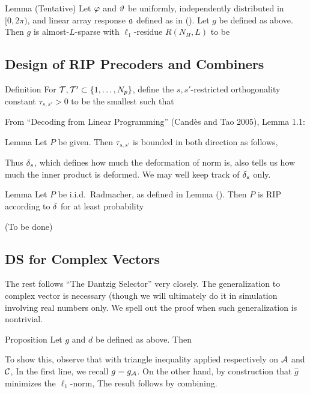 \Result
{Lemma (Tentative)}
{
Let \(\varphi\) and \(\vartheta\) be uniformly, independently distributed in \([0,2\pi)\), and linear array response \(\V{a}\) defined as in ().
Let \(g\) be defined as above.
Then \(g\) is almost-\(L\)-sparse with \(\ell_1\)-residue \(R(N_H, L)\) to be
%
}

\subsection{Design of RIP Precoders and Combiners}

\Result
{Definition}
{
For \(\mathcal{T}, \mathcal{T}' \subset \{1, \dotsc, N_p\}\), define the \(s,s'\)-restricted orthogonality constant \(\tau_{s,s'} >0\) to be the smallest such that
%
}

From ``Decoding from Linear Programming'' (Cand\`es and Tao 2005), Lemma 1.1:

\Result
{Lemma}
{
Let \(P\) be given.
Then \(\tau_{s, s'}\) is bounded in both direction as follows,
}

Thus \(\delta_s\), which defines how much the deformation of norm is, also tells us how much the inner product is deformed.
We may well keep track of \(\delta_s\) only.

\Result
{Lemma}
{
Let \(P\) be i.i.d.\ Radmacher, as defined in Lemma ().
Then \(P\) is RIP according to \(\delta\) for at least probability
}


{ \color{red} (To be done) }

\subsection{DS for Complex Vectors}

The rest follows ``The Dantzig Selector'' very closely.
The generalization to complex vector is necessary (though we will ultimately do it in simulation involving real numbers only.
We spell out the proof when such generalization is nontrivial.

\Result
{Proposition}
{
Let \(g\) and \(d\) be defined as above.
Then
%
}

To show this, observe that with triangle inequality applied respectively on \(\mathcal{A}\) and \(\mathcal{C}\),
In the first line, we recall \(g =g_{\mathcal{A}}\).
On the other hand, by construction that \(\hat{g}\) minimizes the \(\ell_1\)-norm,
The result follows by combining.

